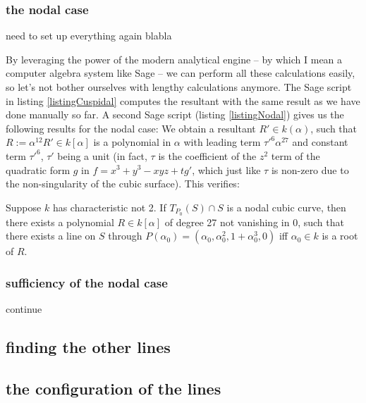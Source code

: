 \subsubsection{the nodal case}
\begin{todo}
\item need to set up everything again blabla
\end{todo}
By leveraging the power of the modern analytical engine -- by which I mean a computer algebra system like Sage \cite{sagemath2014} -- we can perform all these calculations easily, so let's not bother ourselves with lengthy calculations anymore.
The Sage script in listing \ref{listingCuspidal} computes the resultant with the same result as we have done manually so far.
A second Sage script (listing \ref{listingNodal}) gives us the following results for the nodal case:
We obtain a resultant $R' \in k(\alpha)$, such that $R := \alpha^{12}R' \in k[\alpha]$ is a polynomial in $\alpha$ with leading term $\tau'^6\alpha^{27}$ and constant term $\tau'^6$, $\tau'$ being a unit (in fact, $\tau$ is the coefficient of the $z^2$ term of the quadratic form $g$ in $f = x^3 + y^3 - xyz + tg'$, which just like $\tau$ is non-zero due to the non-singularity of the cubic surface).
This verifies:
\begin{proposition}
Suppose $k$ has characteristic not 2.
If $T_{P_0}(S) \cap S$ is a nodal cubic curve, then there exists a polynomial $R \in k[\alpha]$ of degree 27 not vanishing in 0, such that there exists a line on $S$ through $P(\alpha_0) = (\alpha_0,\alpha_0^2,1+\alpha_0^3,0)$ iff $\alpha_0 \in k$ is a root of $R$.
\end{proposition}

\subsubsection{sufficiency of the nodal case}


\begin{todo}
\item continue
\item \cite{sagemath2014}
\end{todo}

\subsection{finding the other lines}
\subsection{the configuration of the lines}


